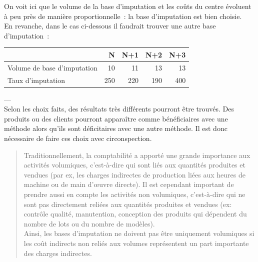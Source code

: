 \documentclass{kaobook}
\begin{document}
On voit ici que le volume de la base d'imputation et les coûts du centre évoluent à peu près de manière proportionnelle : la base d'imputation est bien choisie.\\

En revanche, dans le cas ci-dessous il faudrait trouver une autre base d'imputation :\\

\begin{center}
\begin{tabular}{lrrrr}
 & N & N+1 & N+2 & N+3\\
\hline
Volume de base d'imputation & 10 & 11 & 13 & 13\\
Taux d'imputation & 250 & 220 & 190 & 400\\
\end{tabular}
\end{center}
---\\
Selon les choix faits, des résultats très différents pourront être trouvés. Des produits ou des clients pourront apparaître comme bénéficiaires avec une méthode alors qu'ils sont déficitaires avec une autre méthode. Il est donc nécessaire de faire ces choix avec circonspection.\\

\begin{quote}
Traditionnellement, la comptabilité a apporté une grande importance aux activités volumiques, c'est-à-dire qui sont liés aux quantités produites et vendues (par ex, les charges indirectes de production liées aux heures de machine ou de main d’œuvre directe). Il est cependant important de prendre aussi en compte les activités non volumiques, c'est-à-dire qui ne sont pas directement reliées aux quantités produites et vendues (ex: contrôle qualité, manutention, conception des produits qui dépendent du nombre de lots ou du nombre de modèles).\\
Ainsi, les bases d’imputation ne doivent pas être uniquement volumiques si les coût indirects non reliés aux volumes représentent un part importante des charges indirectes.\\
\end{quote}
\end{document}
